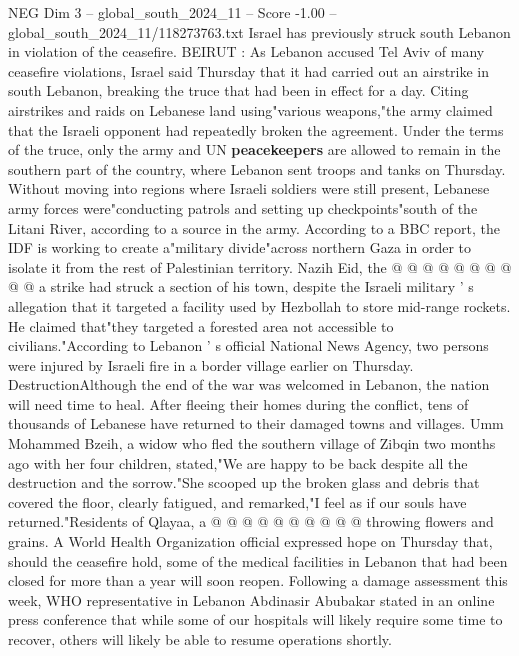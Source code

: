 \begin{textsample}{NEG Dim 3 – global\_south\_2024\_11 – Score -1.00 – global\_south\_2024\_11/118273763.txt}  \label{ex:f3_neg_134}
Israel has previously struck south Lebanon in violation of the ceasefire.
BEIRUT : As Lebanon accused Tel Aviv of many ceasefire violations, Israel said Thursday that it had carried out an airstrike in south Lebanon, breaking the truce that had been in effect for a day.
Citing airstrikes and raids on Lebanese land using"various weapons,"the army claimed that the Israeli opponent had repeatedly broken the agreement.
Under the terms of the truce, only the army and UN \textbf{peacekeepers} are allowed to remain in the southern part of the country, where Lebanon sent troops and tanks on Thursday.
Without moving into regions where Israeli soldiers were still present, Lebanese army forces were"conducting patrols and setting up checkpoints"south of the Litani River, according to a source in the army.
According to a BBC report, the IDF is working to create a"military divide"across northern Gaza in order to isolate it from the rest of Palestinian territory.
Nazih Eid, the @ @ @ @ @ @ @ @ @ @ a strike had struck a section of his town, despite the Israeli military ' s allegation that it targeted a facility used by Hezbollah to store mid-range rockets.
He claimed that"they targeted a forested area not accessible to civilians."According to Lebanon ' s official National News Agency, two persons were injured by Israeli fire in a border village earlier on Thursday.
DestructionAlthough the end of the war was welcomed in Lebanon, the nation will need time to heal.
After fleeing their homes during the conflict, tens of thousands of Lebanese have returned to their damaged towns and villages.
Umm Mohammed Bzeih, a widow who fled the southern village of Zibqin two months ago with her four children, stated,"We are happy to be back despite all the destruction and the sorrow."She scooped up the broken glass and debris that covered the floor, clearly fatigued, and remarked,"I feel as if our souls have returned."Residents of Qlayaa, a @ @ @ @ @ @ @ @ @ @ throwing flowers and grains.
A World Health Organization official expressed hope on Thursday that, should the ceasefire hold, some of the medical facilities in Lebanon that had been closed for more than a year will soon reopen.
Following a damage assessment this week, WHO representative in Lebanon Abdinasir Abubakar stated in an online press conference that while some of our hospitals will likely require some time to recover, others will likely be able to resume operations shortly.

\end{textsample}
